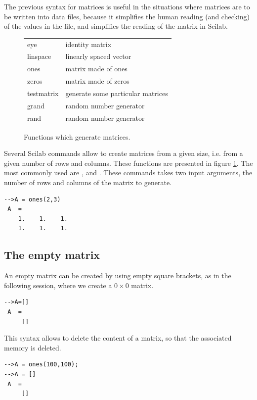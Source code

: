 The previous syntax for matrices is useful in the situations
where matrices are to be written into data files, because it 
simplifies the human reading (and checking) of the values in the file,
and simplifies the reading of the matrix in Scilab.


\begin{figure}
\begin{center}
\begin{tabular}{|ll|}
\hline
eye & identity matrix \\
linspace & linearly spaced vector \\
ones & matrix made of ones \\
zeros & matrix made of zeros \\
testmatrix & generate some particular matrices \\
grand & random number generator \\
rand & random number generator \\
\hline
\end{tabular}
\end{center}
\caption{Functions which generate matrices.}
\label{fig-introscilab-genmatrix}
\end{figure}

Several Scilab commands allow to create matrices from a given 
size, i.e. from a given number of rows and columns. These functions 
are presented in figure \ref{fig-introscilab-genmatrix}.
The most commonly used are ,  and .
These commands takes two input arguments, the number of rows and columns of the 
matrix to generate.
\lstset{language=scilabscript}
\begin{lstlisting}
-->A = ones(2,3)
 A  =
    1.    1.    1.  
    1.    1.    1.  
\end{lstlisting}

\subsection{The empty matrix \scivar{[]}}

An empty matrix can be created by using empty square brackets, as  
in the following session, where we create a $0\times 0$ matrix.
\lstset{language=scilabscript}
\begin{lstlisting}
-->A=[]
 A  =
     []
\end{lstlisting}

This syntax allows to delete the content of a matrix, so that the 
associated memory is deleted. 
\lstset{language=scilabscript}
\begin{lstlisting}
-->A = ones(100,100);
-->A = []
 A  =
     []
\end{lstlisting}


